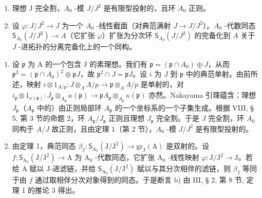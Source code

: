 \begin{enumerate}
\def\labelenumi{\alph{enumi})}
\item
  理想 J 完全割，\(A_{0}\) -模 \(J/J^{2}\) 是有限型投射的，且环 \(A_{0}\) 正则。
\item
  设 \(\varphi: J/J^{2} \to J\) 为一个 \(A_{0}\) -线性截面（对典范满射 \(J \to J/J^{2}\)）。\(A_{0}\) -代数同态 \(\mathsf{S}_{A_{0}}(J/J^{2}) \longrightarrow A\)（它扩张 \(\varphi\)）扩张为分次环 \(\mathsf{S}_{A_{0}}(J/J^{2})\) 的完备化到 \(A\) 关于 \(J\) -进拓扑的分离完备化上的一个同构。
\end{enumerate}

\begin{enumerate}
\def\labelenumi{\alph{enumi})}
\item
  设 \(\mathfrak{p}\) 为 A 的一个包含 J 的素理想。我们有 \(\mathfrak{p} = (\mathfrak{p} \cap A_0) \oplus J\)，从而 \(\mathfrak{p}^2 = (\mathfrak{p} \cap A_0)^2 \oplus \mathfrak{p}J\)，故 \(\mathfrak{p}^2 \cap J = \mathfrak{p}J\)。设 \(i\) 为 \(J\) 到 \(\mathfrak{p}\) 中的典范单射。由前所述，映射 \(i \otimes 1_{A/p}: J \otimes_A A/p \longrightarrow \mathfrak{p} \otimes_A A/p\) 是单射的，对 \(i_{\mathfrak{p}} \otimes 1_{\kappa(\mathfrak{p})}: J_{\mathfrak{p}} \otimes_{A_{\mathfrak{p}}} \kappa(\mathfrak{p}) \longrightarrow \mathfrak{p}A_{\mathfrak{p}} \otimes_{A_{\mathfrak{p}}} \kappa(\mathfrak{p})\) 亦然。Nakayama 引理蕴含：理想 \(J_{\mathfrak{p}}\)（\(A_{\mathfrak{p}}\) 中的）由正则局部环 \(A_{\mathfrak{p}}\) 的一个坐标系的一个子集生成。根据 VIII, § 5, 第 3 节的命题 2，环 \(A_{\mathfrak{p}}/J_{\mathfrak{p}}\) 正则且理想 \(J_{\mathfrak{p}}\) 完全割。于是 \(J\) 完全割，环 \(A_0\) 同构于 \(A/J\) 故正则，且由定理 1（第 2 节），\(A_0\) -模 \(J/J^2\) 是有限型投射的。
\item
  由定理 1，典范同态 \(\beta_{\mathrm{J}}: \mathsf{S}_{\mathrm{A}_{0}}(\mathrm{J}/\mathrm{J}^{2}) \longrightarrow \mathrm{gr}_{\mathrm{J}}(\mathrm{A})\) 是双射的。设 \(f: \mathsf{S}_{\mathrm{A}_{0}}(\mathrm{J}/\mathrm{J}^{2}) \longrightarrow \mathrm{A}\) 为 \(\mathrm{A}_{0}\) -代数同态，它扩张 \(\mathrm{A}_{0}\) -线性映射 \(\varphi: \mathrm{J}/\mathrm{J}^{2} \longrightarrow \mathrm{J}\)。若给 A 赋以 J-进滤链，并给 \(\mathsf{S}_{\mathrm{A}_{0}}(\mathrm{J}/\mathrm{J}^{2})\) 赋以与其分次相伴的滤链，则 \(\beta_{\mathrm{J}}\) 等同于由 \(f\) 通过取相伴分次对象得到的同态。于是断言 b) 由 III, § 2, 第 8 节, 定理 1 的推论 3 得出。
\end{enumerate}

